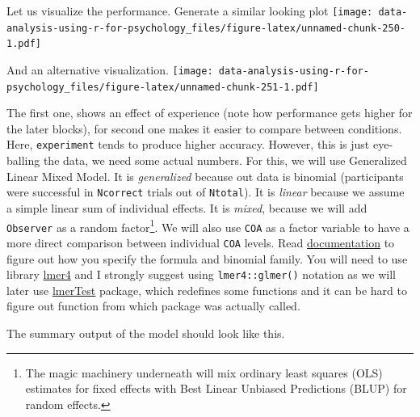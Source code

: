 \documentclass[
]{book}
\begin{document}
Let us visualize the performance. Generate a similar looking plot
\texttt{[image: data-analysis-using-r-for-psychology\_files/figure-latex/unnamed-chunk-250-1.pdf]}

And an alternative visualization.
\texttt{[image: data-analysis-using-r-for-psychology\_files/figure-latex/unnamed-chunk-251-1.pdf]}

The first one, shows an effect of experience (note how performance gets higher for the later blocks), for second one makes it easier to compare between conditions. Here, \texttt{experiment} tends to produce higher accuracy. However, this is just eye-balling the data, we need some actual numbers. For this, we will use Generalized Linear Mixed Model. It is \emph{generalized} because out data is binomial (participants were successful in \texttt{Ncorrect} trials out of \texttt{Ntotal}). It is \emph{linear} because we assume a simple linear sum of individual effects. It is \emph{mixed}, because we will add \texttt{Observer} as a random factor\footnote{The magic machinery underneath will mix ordinary least squares (OLS) estimates for fixed effects with Best Linear Unbiased Predictions (BLUP) for random effects.}. We will also use \texttt{COA} as a factor variable to have a more direct comparison between individual \texttt{COA} levels. Read \href{https://www.rdocumentation.org/packages/lme4/versions/1.1-26/topics/glmer}{documentation} to figure out how you specify the formula and binomial family. You will need to use library \href{https://github.com/lme4/lme4}{lmer4} and I strongly suggest using \texttt{lmer4::glmer()} notation as we will later use \href{}{lmerTest} package, which redefines some functions and it can be hard to figure out function from which package was actually called.

The summary output of the model should look like this.
\end{document}
